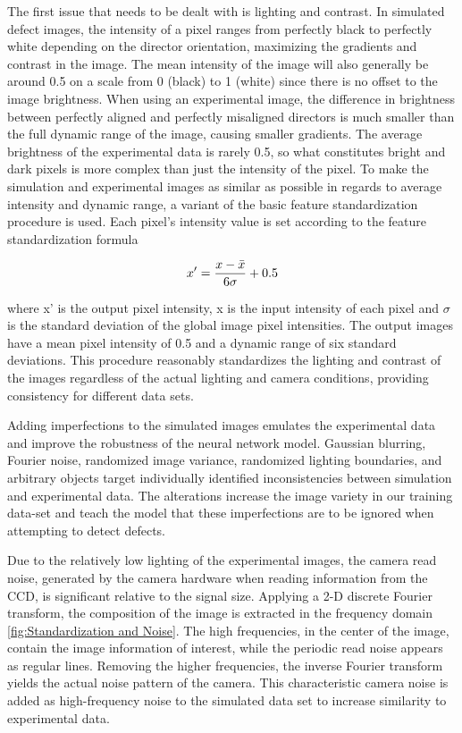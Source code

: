 \documentclass[prl,reprint,showpacs,floatfix,nofootinbib]{revtex4-1}
\begin{document}
The first issue that needs to be dealt with is lighting and contrast. In simulated defect images, the intensity of a pixel ranges from perfectly black to perfectly white depending on the director orientation, maximizing the gradients and contrast in the image. The mean intensity of the image will also generally be around 0.5 on a scale from 0 (black) to 1 (white) since there is no offset to the image brightness. When using an experimental image, the difference in brightness between perfectly aligned and perfectly misaligned directors is much smaller than the full dynamic range of the image, causing smaller gradients. The average brightness of the experimental data is rarely 0.5, so what constitutes bright and dark pixels is more complex than just the intensity of the pixel. To make the simulation and experimental images as similar as possible in regards to average intensity and dynamic range, a variant of the basic feature standardization procedure\cite{aksoy_feature_2001} is used. Each pixel's intensity value is set according to the feature standardization formula

$$ x' = \frac{x - \Bar{x}}{6\sigma} +0.5 $$

where x' is the output pixel intensity, x is the input intensity of each pixel and $\sigma$ is the standard deviation of the global image pixel intensities. The output images have a mean pixel intensity of 0.5 and a dynamic range of six standard deviations. This procedure reasonably standardizes the lighting and contrast of the images regardless of the actual lighting and camera conditions, providing consistency for different data sets.

Adding imperfections to the simulated images emulates the experimental data and improve the robustness\cite{goodfellow_explaining_2014}\cite{bishop_training_1995} of the neural network model. Gaussian blurring, Fourier noise, randomized image variance, randomized lighting boundaries, and arbitrary objects target individually identified inconsistencies between simulation and experimental data. The alterations increase the image variety in our training data-set and teach the model that these imperfections are to be ignored when attempting to detect defects.

Due to the relatively low lighting of the experimental images, the camera read noise, generated by the camera hardware when reading information from the CCD, is significant relative to the signal size. Applying a 2-D discrete Fourier transform, the composition of the image is extracted in the frequency domain\cite{kaur_periodic_nodate} \ref{fig:Standardization and Noise}. The high frequencies, in the center of the image, contain the image information of interest, while the periodic read noise appears as regular lines. Removing the higher frequencies, the inverse Fourier transform yields the actual noise pattern of the camera. This characteristic camera noise is added as high-frequency noise to the simulated data set to increase similarity to experimental data.
\end{document}
